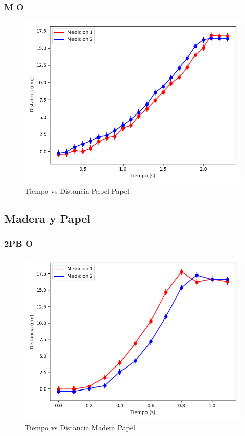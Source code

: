 \documentclass[12pt,a4]{article}
\begin{document}
\subsubsection{M O}

\begin{figure}[H]
    \centering
    \includegraphics[width=0.9\linewidth]{TiempoVsDistanciaPapelPapelM_O.png}
    \caption{Tiempo vs Distancia Papel Papel}
    \label{fig:TvDM_O papel papel}
\end{figure}

\subsection{Madera y Papel}

\subsubsection{2PB O}

\begin{figure}[H]
    \centering
    \includegraphics[width=0.9\linewidth]{TiempoVsDistanciaPisoHoja2PB_O.png}
    \caption{Tiempo vs Distancia Madera Papel}
    \label{fig:TvD2PB_O piso hoja}
\end{figure}
\end{document}
